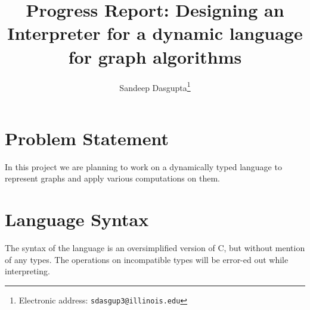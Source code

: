 \documentclass[12,twoside]{article}
\title{\textbf{Progress Report: Designing an Interpreter for a dynamic language 
  for graph algorithms}}
\author{Sandeep Dasgupta\thanks{Electronic address:
\texttt{sdasgup3@illinois.edu}}}
\begin{document}
\begin{titlepage}
\thispagestyle{empty}
\maketitle
\pagebreak
\end{titlepage}

\section{Problem Statement}

   In this project we are planning to work on a dynamically typed language to 
     represent graphs and apply various computations on them.
 
\section{Language Syntax}
  The syntax of the language is an oversimplified version  of C, but
    without mention of any types. The operations on incompatible types
    will be error-ed out while interpreting.
\end{document}
